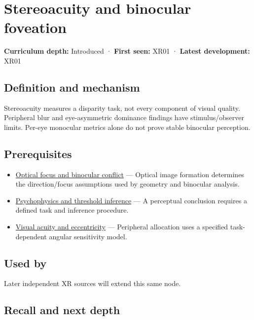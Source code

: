 \hypertarget{appendix-8dc848f14052}{}
\section{Stereoacuity and binocular foveation}\label{appendix-8dc848f14052-stereoacuity-and-binocular-foveation}

\textbf{Curriculum depth:} Introduced · \textbf{First seen:} XR01 · \textbf{Latest development:} XR01

\subsection{Definition and mechanism}\label{appendix-8dc848f14052-definition-and-mechanism}

Stereoacuity measures a disparity task, not every component of visual quality. Peripheral blur and eye-asymmetric dominance findings have stimulus/observer limits. Per-eye monocular metrics alone do not prove stable binocular perception.

\subsection{Prerequisites}\label{appendix-8dc848f14052-prerequisites}

\begin{itemize}
\tightlist
\item
  \hyperref[appendix-f90cee1be7a4]{Optical focus and binocular conflict} --- Optical image formation determines the direction/focus assumptions used by geometry and binocular analysis.
\item
  \hyperref[appendix-1759f03e8ce7]{Psychophysics and threshold inference} --- A perceptual conclusion requires a defined task and inference procedure.
\item
  \hyperref[appendix-b491fc48c54b]{Visual acuity and eccentricity} --- Peripheral allocation uses a specified task-dependent angular sensitivity model.
\end{itemize}

\subsection{Used by}\label{appendix-8dc848f14052-used-by}

Later independent XR sources will extend this same node.

\subsection{Recall and next depth}\label{appendix-8dc848f14052-recall-and-next-depth}

